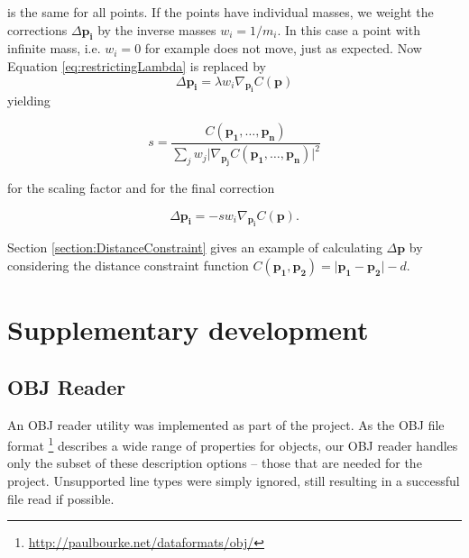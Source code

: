 \documentclass[sigplan,screen,nonacm]{acmart}
\renewcommand{\b}{\boldsymbol}
\begin{document}
is the same for all points. If the points have individual masses, we weight the
corrections $\Delta \b{p_i}$ by the inverse masses $w_i = 1/m_i$. In this case
a point with infinite mass, i.e. $w_i = 0$ for example does not move, just as
expected. Now Equation \ref{eq:restrictingLambda} is replaced by 
$$
\Delta \b{p_i} = \lambda w_i \nabla_{\b{p_i}}C(\b{p})
$$
yielding

\begin{equation}
    s = \frac{
        C(\b{p_1}, \ldots, \b{p_n})
    }{
        \sum\limits_{j}w_j\lvert\nabla_{\b{p_j}}C(\b{p_1},\ldots,\b{p_n})\rvert^2
    }
\end{equation}

for the scaling factor and for the final correction 

\begin{equation}
    \Delta \b{p_i} = -s w_i \nabla_{\b{p_i}}C(\b{p}).
\end{equation}


Section \ref{section:DistanceConstraint} gives an example of calculating $\Delta
\b{p}$ by considering the distance constraint function $C(\b{p_1},\b{p_2})
= \lvert\b{p_1}-\b{p_2}\rvert - d$.


\section{Supplementary development}

\subsection{OBJ Reader}
\label{section:appendixOBJ}

An OBJ reader utility was implemented as part of the project. As the OBJ file
format \footnote{\url{http://paulbourke.net/dataformats/obj/}} describes a wide
range of properties for objects, our OBJ reader handles only the subset of these
description options -- those that are needed for the project. Unsupported line
types were simply ignored, still resulting in a successful file read if
possible.
\end{document}
